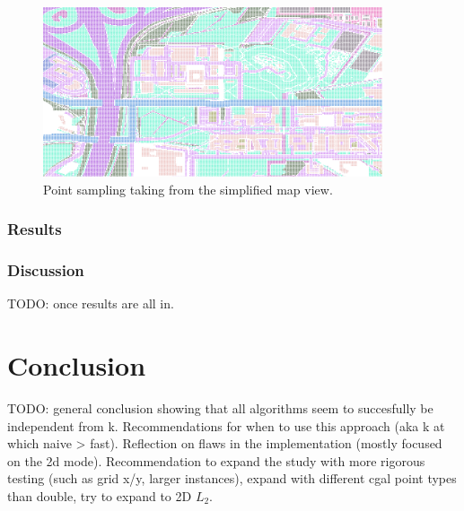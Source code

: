 \documentclass{article}
\begin{document}
\begin{figure}
    \centering
    \includegraphics[width=10cm]{figs/usp_points.png}
    \caption{Point sampling taking from the simplified map view.}
    \label{fig:uithof-points}
\end{figure}

\subsubsection*{Results}




\subsubsection*{Discussion}
TODO: once results are all in. 

\section{Conclusion}
TODO: general conclusion showing that all algorithms seem to succesfully be independent from k. Recommendations for when to use this approach (aka k at which naive > fast). Reflection on flaws in the implementation (mostly focused on the 2d mode). Recommendation to expand the study with more rigorous testing (such as grid x/y, larger instances), expand with different cgal point types than double, try to expand to 2D $L_2$. 

\printbibliography
\end{document}
